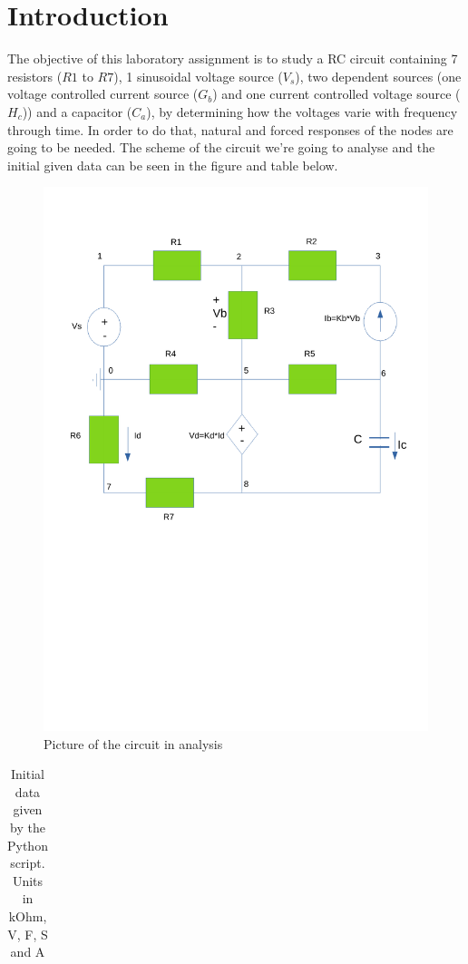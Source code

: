 \section{Introduction}
\label{sec:introduction}

\noindent \par The objective of this laboratory assignment is to study a RC circuit containing 7 resistors ($R1$ to $R7$), 1 sinusoidal voltage source ($V_s$), two dependent sources (one voltage controlled current source ($G_b$) and one current controlled voltage source ($H_c$)) and a capacitor ($C_a$), by determining how the voltages varie with frequency through time. In order to do that, natural and forced responses of the nodes are going to be needed.
The scheme of the circuit we're going to analyse and the initial given data can be seen in the figure and table below.

\begin{figure}[h!] \centering
\includegraphics[width=0.6\linewidth]{Desenho_intro.pdf}
\caption{Picture of the circuit in analysis}
\label{fig:V(t)}
\end{figure}

\begin{table}[h!]
\label{tab1}
\centering
\begin{tabularx}{0.6 \textwidth} {
  | >{\raggedright\arraybackslash}X
  | >{\raggedleft\arraybackslash}X | }
 \hline
 
\end{tabularx}
\caption{Initial data given by the Python script. Units in kOhm, V, F, S and A}
\end{table}

